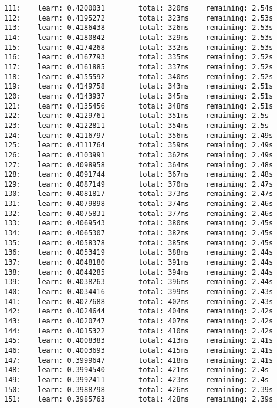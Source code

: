 \documentclass[11pt]{article}
\begin{document}
\begin{Verbatim}[commandchars=\\\{\}]
111:    learn: 0.4200031        total: 320ms    remaining: 2.54s
112:    learn: 0.4195272        total: 323ms    remaining: 2.53s
113:    learn: 0.4186438        total: 326ms    remaining: 2.53s
114:    learn: 0.4180842        total: 329ms    remaining: 2.53s
115:    learn: 0.4174268        total: 332ms    remaining: 2.53s
116:    learn: 0.4167793        total: 335ms    remaining: 2.52s
117:    learn: 0.4161885        total: 337ms    remaining: 2.52s
118:    learn: 0.4155592        total: 340ms    remaining: 2.52s
119:    learn: 0.4149758        total: 343ms    remaining: 2.51s
120:    learn: 0.4143937        total: 345ms    remaining: 2.51s
121:    learn: 0.4135456        total: 348ms    remaining: 2.51s
122:    learn: 0.4129761        total: 351ms    remaining: 2.5s
123:    learn: 0.4122811        total: 354ms    remaining: 2.5s
124:    learn: 0.4116797        total: 356ms    remaining: 2.49s
125:    learn: 0.4111764        total: 359ms    remaining: 2.49s
126:    learn: 0.4103991        total: 362ms    remaining: 2.49s
127:    learn: 0.4098958        total: 364ms    remaining: 2.48s
128:    learn: 0.4091744        total: 367ms    remaining: 2.48s
129:    learn: 0.4087149        total: 370ms    remaining: 2.47s
130:    learn: 0.4081817        total: 373ms    remaining: 2.47s
131:    learn: 0.4079898        total: 374ms    remaining: 2.46s
132:    learn: 0.4075831        total: 377ms    remaining: 2.46s
133:    learn: 0.4069543        total: 380ms    remaining: 2.45s
134:    learn: 0.4065307        total: 382ms    remaining: 2.45s
135:    learn: 0.4058378        total: 385ms    remaining: 2.45s
136:    learn: 0.4053419        total: 388ms    remaining: 2.44s
137:    learn: 0.4048180        total: 391ms    remaining: 2.44s
138:    learn: 0.4044285        total: 394ms    remaining: 2.44s
139:    learn: 0.4038263        total: 396ms    remaining: 2.44s
140:    learn: 0.4034416        total: 399ms    remaining: 2.43s
141:    learn: 0.4027688        total: 402ms    remaining: 2.43s
142:    learn: 0.4024644        total: 404ms    remaining: 2.42s
143:    learn: 0.4020747        total: 407ms    remaining: 2.42s
144:    learn: 0.4015322        total: 410ms    remaining: 2.42s
145:    learn: 0.4008383        total: 413ms    remaining: 2.41s
146:    learn: 0.4003693        total: 415ms    remaining: 2.41s
147:    learn: 0.3999647        total: 418ms    remaining: 2.41s
148:    learn: 0.3994540        total: 421ms    remaining: 2.4s
149:    learn: 0.3992411        total: 423ms    remaining: 2.4s
150:    learn: 0.3988798        total: 426ms    remaining: 2.39s
151:    learn: 0.3985763        total: 428ms    remaining: 2.39s

\end{Verbatim}
\end{document}
